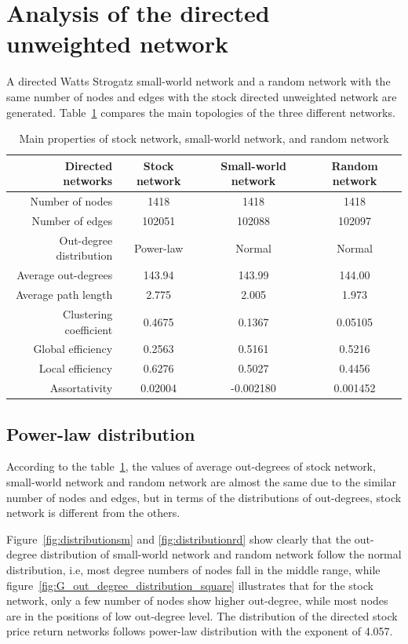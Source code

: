 \section{Analysis of the directed unweighted network}
A directed Watts Strogatz small-world network and a random network with the same number of nodes and edges with the stock directed unweighted network are generated. Table~\ref{tab:three} compares the main topologies of the three different networks.

\begin{table}
	\begin{center}
		\begin{tabular}{|r|c|c|c|}\hline\hline
			Directed networks&Stock network&Small-world network&Random network\\\hline
			Number of nodes&1418&1418&1418\\
			Number of edges&102051&102088&102097\\
			Out-degree distribution&Power-law&Normal&Normal\\
			Average out-degrees&143.94&143.99&144.00\\
			Average path length&2.775&2.005&1.973\\
			Clustering coefficient&0.4675&0.1367&0.05105\\
			Global efficiency&0.2563&0.5161&0.5216\\
			Local efficiency&0.6276&0.5027&0.4456\\
			Assortativity&0.02004&-0.002180&0.001452\\
			\hline\hline
		\end{tabular}
	\end{center}
	\caption{Main properties of stock network, small-world network, and random network}\label{tab:three}
\end{table}

\subsection{Power-law distribution}
According to the table~\ref{tab:three}, the values of average out-degrees of stock network, small-world network and random network are almost the same due to the similar number of nodes and edges, but in terms of the distributions of out-degrees, stock network is different from the others. 

Figure~\ref{fig:distributionsm} and \ref{fig:distributionrd} show clearly that the out-degree distribution of small-world network and random network follow the normal distribution, i.e, most degree numbers of nodes fall in the middle range, while figure~\ref{fig:G_out_degree_distribution_square} illustrates that for the stock network, only a few number of nodes show higher out-degree, while most nodes are in the positions of low out-degree level. The distribution of the directed stock price return networks follows power-law distribution with the exponent of 4.057.


